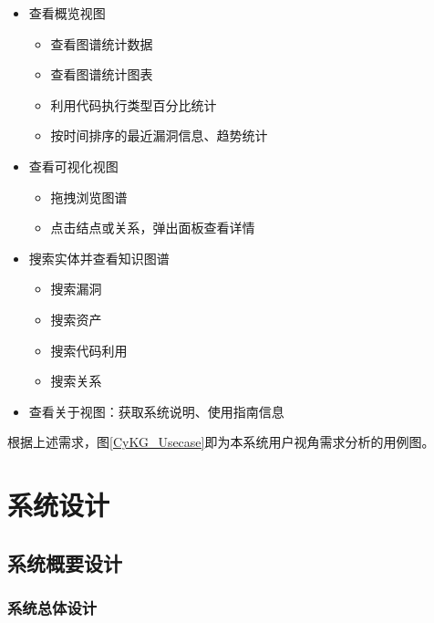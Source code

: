 \documentclass[a4paper,AutoFakeBold,oneside,12pt]{book}
\begin{document}
\begin{itemize}
	\item 查看概览视图
	      \begin{itemize}
		      \item 查看图谱统计数据
		      \item 查看图谱统计图表
		      \item 利用代码执行类型百分比统计
		      \item 按时间排序的最近漏洞信息、趋势统计
	      \end{itemize}
	\item 查看可视化视图
	      \begin{itemize}
		      \item 拖拽浏览图谱
		      \item 点击结点或关系，弹出面板查看详情
	      \end{itemize}
	\item 搜索实体并查看知识图谱
	      \begin{itemize}
		      \item 搜索漏洞
		      \item 搜索资产
		      \item 搜索代码利用
		      \item 搜索关系
	      \end{itemize}
	\item 查看关于视图：获取系统说明、使用指南信息
\end{itemize}

根据上述需求，图\ref{CyKG_Usecase}即为本系统用户视角需求分析的用例图。


\chapter{系统设计}

\section{系统概要设计}

\subsection{系统总体设计}
\end{document}
